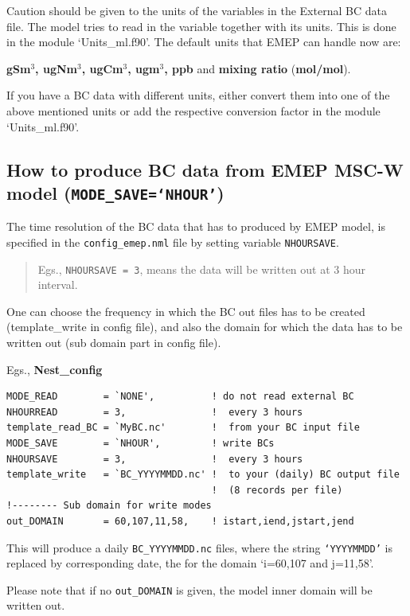\documentclass[a4paper,12pt]{report}
\begin{document}
Caution should be given to the units of the variables in the External BC data file.  The model tries to read in the variable together with its units.  This is done in the module `Units\_ml.f90'.  The default units that EMEP can handle now are: 

	{\bf gSm$^{3}$, ugNm$^{3}$, ugCm$^{3}$,  ugm$^{3}$, ppb} and {\bf mixing ratio} ({\bf mol/mol}).

If you have a BC data with different units, either convert them into one of the above 	mentioned units or add the respective conversion factor in the module `Units\_ml.f90'.  

\subsection{How to produce BC data from EMEP MSC-W model  ({\tt MODE\_SAVE=`NHOUR'})}
	
The time resolution of the BC data that has to produced by EMEP model, is specified in the {\tt config\_emep.nml} file by setting variable {\tt NHOURSAVE}. 
\begin{quote}
Egs., {\tt NHOURSAVE = 3},  means the data will be written out at 3 hour interval. 
\end{quote}

One can choose the frequency in which the BC out files has to be created (template\_write in config file), and also the domain for which the data has to be written out (sub domain part in config file).
 
Egs.,  {\bf Nest\_config}

\begin{verbatim}
MODE_READ        = `NONE',          ! do not read external BC 
NHOURREAD        = 3,               !  every 3 hours
template_read_BC = `MyBC.nc'        !  from your BC input file
MODE_SAVE        = `NHOUR',         ! write BCs
NHOURSAVE        = 3,               !  every 3 hours
template_write   = `BC_YYYYMMDD.nc' !  to your (daily) BC output file
                                    !  (8 records per file)				
!-------- Sub domain for write modes 
out_DOMAIN       = 60,107,11,58,    ! istart,iend,jstart,jend
\end{verbatim}

This will produce a daily {\tt BC\_YYYYMMDD.nc} files,
where the string {\tt `YYYYMMDD'} is replaced by corresponding date, the for the domain `i=60,107 and j=11,58'.  

Please note that if no {\tt out\_DOMAIN} is given, the model inner domain will be written out.
\end{document}
